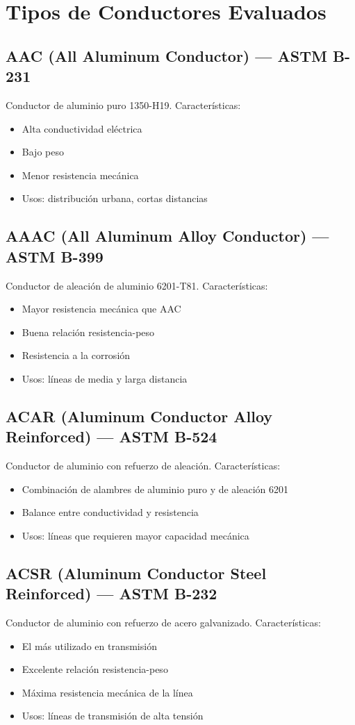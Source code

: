 \documentclass[12pt,a4paper]{article}
\begin{document}
\section{Tipos de Conductores Evaluados}

\subsection{AAC (All Aluminum Conductor) --- ASTM B-231}
Conductor de aluminio puro 1350-H19. Características:
\begin{itemize}
    \item Alta conductividad eléctrica
    \item Bajo peso
    \item Menor resistencia mecánica
    \item Usos: distribución urbana, cortas distancias
\end{itemize}

\subsection{AAAC (All Aluminum Alloy Conductor) --- ASTM B-399}
Conductor de aleación de aluminio 6201-T81. Características:
\begin{itemize}
    \item Mayor resistencia mecánica que AAC
    \item Buena relación resistencia-peso
    \item Resistencia a la corrosión
    \item Usos: líneas de media y larga distancia
\end{itemize}

\subsection{ACAR (Aluminum Conductor Alloy Reinforced) --- ASTM B-524}
Conductor de aluminio con refuerzo de aleación. Características:
\begin{itemize}
    \item Combinación de alambres de aluminio puro y de aleación 6201
    \item Balance entre conductividad y resistencia
    \item Usos: líneas que requieren mayor capacidad mecánica
\end{itemize}

\subsection{ACSR (Aluminum Conductor Steel Reinforced) --- ASTM B-232}
Conductor de aluminio con refuerzo de acero galvanizado. Características:
\begin{itemize}
    \item El más utilizado en transmisión
    \item Excelente relación resistencia-peso
    \item Máxima resistencia mecánica de la línea
    \item Usos: líneas de transmisión de alta tensión
\end{itemize}
\end{document}
